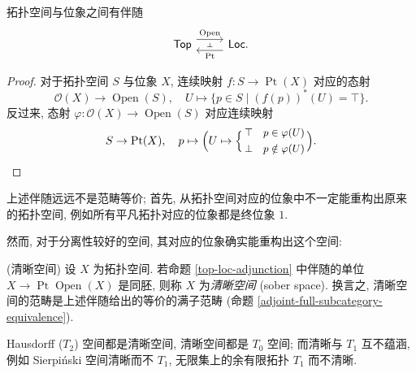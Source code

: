 \begin{prop}
	[label={top-loc-adjunction}]
	{}
	拓扑空间与位象之间有伴随
	\[\begin{tikzcd}[ampersand replacement=\&]
		{\mathsf {Top}} \& {\mathsf {Loc}.}
		\arrow[""{name=0, anchor=center, inner sep=0}, "{\operatorname{Open}}", shift left=2, from=1-1, to=1-2]
		\arrow[""{name=1, anchor=center, inner sep=0}, "{\operatorname{Pt}}", shift left=2, from=1-2, to=1-1]
		\arrow["\dashv"{anchor=center, rotate=-90}, draw=none, from=0, to=1]
	\end{tikzcd}\]
\end{prop}
\begin{proof}
	对于拓扑空间 $S$ 与位象 $X$,
	连续映射 $f\colon S \to \operatorname{Pt}(X)$
	对应\fm{}的态射 $$ \mathcal O(X) \to \operatorname{Open}(S),\quad U\mapsto \{p\in S \mid (f(p))^*(U)=\top\}.$$
	反过来, 态射 $\varphi\colon \mathcal O(X) \to \operatorname{Open}(S)$
	对应连续映射
	\[
	S\to\operatorname{Pt}(X),\quad
	p\mapsto \Big(U\mapsto \Bigl\{\,{\small \begin{aligned}
		\top &\ \ \ p\in\varphi(U)\\
		\bot &\ \ \ p\notin \varphi(U)
	\end{aligned}}\Bigr.\,\Big).
	\]
\end{proof}

上述伴随远远不是范畴等价; 首先, 从拓扑空间对应的位象中不一定能重构出原来的拓扑空间, 例如所有平凡拓扑对应的位象都是终位象 $1$.

然而, 对于分离性较好的空间, 其对应的位象确实能重构出这个空间:
\begin{definition}
	{(清晰空间)}
	设 $X$ 为拓扑空间. 若命题 \ref{top-loc-adjunction} 中伴随的单位 $X \to \operatorname{Pt}\operatorname{Open}(X)$ 是同胚,
	则称 $X$ 为\emph{清晰空间} (sober space\footnotemark). 换言之, 清晰空间的范畴是上述伴随给出的等价的满子范畴 (命题 \ref{adjoint-full-subcategory-equivalence}).
\end{definition}

\begin{prop}
	{}
	Hausdorff ($T_2$) 空间都是清晰空间, 清晰空间都是 $T_0$ 空间; 而清晰与 $T_1$ 互不蕴涵, 例如 Sierpi\'nski 空间清晰而不 $T_1$, 无限集上的余有限拓扑 $T_1$ 而不清晰.
\end{prop}

